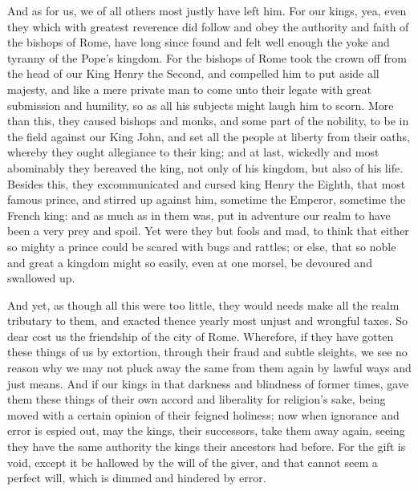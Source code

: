 And as for us, we of all others most justly have left him.
For our kings, yea, even they which with
greatest reverence did follow and obey the authority and faith of the
bishops of Rome, have long since found and felt well enough the yoke
and tyranny of the Pope’s kingdom. For the bishops of Rome
took the crown off from the head of our King Henry the Second, and compelled
him to put aside all majesty, and like a mere private man to come unto
their legate with great submission and humility, so as all his subjects
might laugh him to scorn. More than this, they caused bishops
and monks, and some part of the nobility, to be in the field against
our King John, and set all the people at liberty from their oaths, whereby
they ought allegiance to their king; and at last, wickedly and most
abominably they bereaved the king, not only of his kingdom, but also
of his life. Besides this, they excommunicated and cursed king
Henry the Eighth, that most famous prince, and stirred up against him,
sometime the Emperor, sometime the French king: and as much as in them
was, put in adventure our realm to have been a very prey and spoil.
Yet were they but fools and mad, to think that either so mighty a prince
could be scared with bugs and rattles; or else, that so noble and great
a kingdom might so easily, even at one morsel, be devoured and swallowed
up.

And
yet, as though all this were too little, they would needs make all the
realm tributary to them, and exacted thence yearly most unjust and wrongful
taxes. So dear cost us the friendship of the city of Rome.
Wherefore, if they have gotten these things of us by extortion, through
their fraud and subtle sleights, we see no reason why we may not pluck
away the same from them again by lawful ways and just means. And
if our kings in that darkness and blindness of former times, gave them
these things of their own accord and liberality for religion’s
sake, being moved with a certain opinion of their feigned holiness;
now when ignorance and error is espied out, may the kings, their successors,
take them away again, seeing they have the same authority the kings
their ancestors had before. For the gift is void, except it be
hallowed by the will of the giver, and that cannot seem a perfect will,
which is dimmed and hindered by error.


